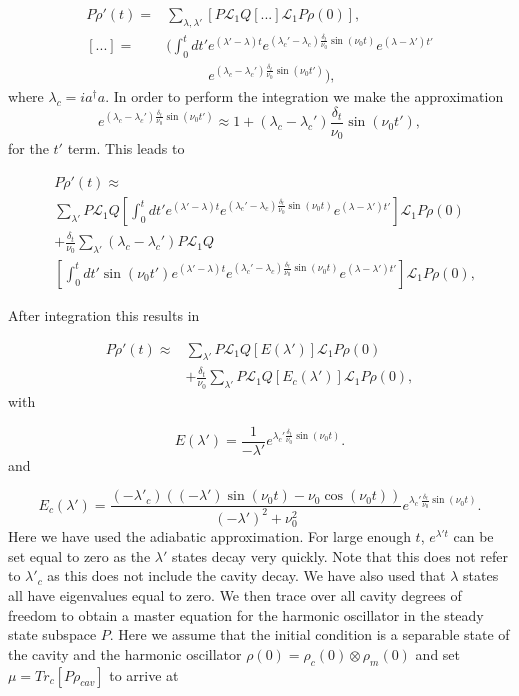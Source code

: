 \documentclass[reprint, amsmath,amssymb, aps,pra]{revtex4-1}
\begin{document}
\begin{align}
P\dot{\rho}'(t)=&\sum_{\lambda,\lambda'}[P \mathcal{L}_1Q[...]\mathcal{L}_1P\rho(0)],\\
[...] =& (\int_0^t dt' e^{(\lambda'-\lambda)t}e^{(\lambda_c'-\lambda_c)\frac{\delta_t}{\nu_0} \sin(\nu_0t)}e^{(\lambda-\lambda')t'}\nonumber \\ 
&\qquad \quad e^{(\lambda_c-\lambda_c')\frac{\delta_t}{\nu_0} \sin(\nu_0t')}),\nonumber
\end{align} where $\lambda_c=ia^\dagger a$. In order to perform the integration we make the approximation
\begin{equation}
e^{(\lambda_c-\lambda_c')\frac{\delta_t}{\nu_0} \sin(\nu_0t')} \approx 1+(\lambda_c-\lambda_c')\frac{\delta_t}{\nu_0} \sin(\nu_0t'),
\end{equation} for the $t'$ term. This leads to

\begin{align}
&P\dot{\rho}'(t)\approx \\
&\sum_{\lambda'}P \mathcal{L}_1Q[\int_0^t dt' e^{(\lambda'-\lambda)t}e^{(\lambda_c'-\lambda_c)\frac{\delta_t}{\nu_0} \sin(\nu_0t)}e^{(\lambda-\lambda')t'}]\mathcal{L}_1P\rho(0)\nonumber \\
&+\frac{\delta_t}{\nu_0}\sum_{\lambda'}(\lambda_c-\lambda_c')P\mathcal{L}_1Q \nonumber\\
&[\int_0^t dt'\sin(\nu_0t') e^{(\lambda'-\lambda)t}e^{(\lambda_c'-\lambda_c)\frac{\delta_t}{\nu_0} \sin(\nu_0t)}e^{(\lambda-\lambda')t'}]\mathcal{L}_1P\rho(0),\nonumber
\end{align}

 After integration this results in

\begin{align}
P\dot{\rho}'(t)\approx& \sum_{\lambda'}P \mathcal{L}_1Q[E(\lambda')]\mathcal{L}_1P\rho(0)\\
&+\frac{\delta_t}{\nu_0}\sum_{\lambda'}P\mathcal{L}_1Q[E_c(\lambda')]\mathcal{L}_1P\rho(0),\nonumber
\end{align}  with

\begin{equation}
E(\lambda') = \frac{1}{-\lambda'}e^{\lambda_c'\frac{\delta_t}{\nu_0}\sin(\nu_0t)}.
\end{equation} and

\begin{equation}
E_c(\lambda')=\frac{(-\lambda'_c)((-\lambda')\sin(\nu_0 t)-\nu_0\cos(\nu_0t))}{(-\lambda')^2 + \nu_0^2}e^{\lambda_c'\frac{\delta_t}{\nu_0}\sin(\nu_0t)}.
\end{equation} Here we have used the adiabatic approximation. For large enough $t$, $e^{\lambda't}$ can be set equal to zero as the $\lambda'$ states decay very quickly. Note that this does not refer to $\lambda'_c$ as this does not include the cavity decay. We have also used that $\lambda$ states all have eigenvalues equal to zero. We then trace over all cavity degrees of freedom to obtain a master equation for the harmonic oscillator in the steady state subspace $P$. Here we assume that the initial condition is a separable state of the cavity and the harmonic oscillator $\rho(0)=\rho_{c}(0)\otimes\rho_{m}(0)$  and  set $\mu = Tr_c[P\rho_{cav}]$ to arrive at 
\end{document}
